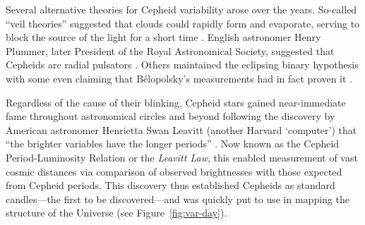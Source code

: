 Several alternative theories for Cepheid variability arose over the years. 
So-called ``veil theories'' suggested that clouds could rapidly form and evaporate, serving to block the source of the light for a short time \citep[e.g.,][]{1889Natur..39..606B}. 
English astronomer Henry Plummer, later President of the Royal Astronomical Society, suggested that Cepheids are radial pulsators \citep{1914MNRAS..74..660P}. 
Others maintained the eclipsing binary hypothesis \citep[e.g.,][]{1909LicOB...5...82D} with some even claiming that B{\'e}lopolsky's measurements had in fact proven it \citep[e.g.,][]{1913Obs....36...59B}. 

Regardless of the cause of their blinking, Cepheid stars gained near-immediate fame throughout astronomical circles and beyond following the discovery by American astronomer Henrietta Swan Leavitt (another Harvard `computer') that ``the brighter variables have the longer periods'' \citep{1908AnHar..60...87L, 1912HarCi.173....1L}. 
Now known as the Cepheid Period-Luminosity Relation or the \emph{Leavitt Law}, this enabled measurement of vast cosmic distances via comparison of observed brightnesses with those expected from Cepheid periods. 
This discovery thus established Cepheids as standard candles---the first to be discovered---and was quickly put to use in mapping the structure of the Universe (see Figure~\ref{fig:var-day}). 




